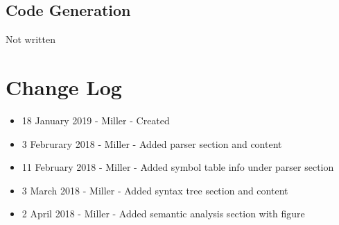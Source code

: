 \documentclass[english]{article}
\begin{document}
\subsection{Code Generation}

Not written



\par\addvspace{1cm}%
\section{Change Log}

\begin{itemize}
\item
18 January 2019 - Miller - Created
\item
3 Februrary 2018 - Miller - Added parser section and content
\item
11 February 2018 - Miller - Added symbol table info under parser section
\item
3 March 2018 - Miller - Added syntax tree section and content
\item
2 April 2018 - Miller - Added semantic analysis section with figure

\end{itemize}
\end{document}
